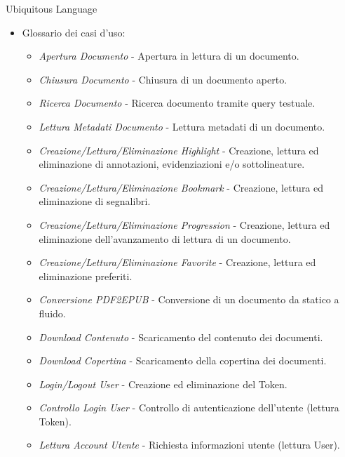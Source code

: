     \begin{frame}{Ubiquitous Language}
        \begin{itemize}
            \item Glossario dei casi d'uso:
                \begin{itemize}
                    \item \textit{Apertura Documento} - Apertura in lettura di un documento.
                    \item \textit{Chiusura Documento} - Chiusura di un documento aperto.
                    \item \textit{Ricerca Documento} - Ricerca documento tramite query testuale.
                    \item \textit{Lettura Metadati Documento} - Lettura metadati di un documento.
                    \item \textit{Creazione/Lettura/Eliminazione Highlight} - Creazione, lettura ed eliminazione di annotazioni, evidenziazioni e/o sottolineature.
                    \item \textit{Creazione/Lettura/Eliminazione Bookmark} - Creazione, lettura ed eliminazione di segnalibri.
                    \item \textit{Creazione/Lettura/Eliminazione Progression} - Creazione, lettura ed eliminazione dell'avanzamento di lettura di un documento.
                    \item \textit{Creazione/Lettura/Eliminazione Favorite} - Creazione, lettura ed eliminazione preferiti.
                    \item \textit{Conversione PDF2EPUB} - Conversione di un documento da statico a fluido.
                    \item \textit{Download Contenuto} - Scaricamento del contenuto dei documenti.
                    \item \textit{Download Copertina} - Scaricamento della copertina dei documenti.
                    \item \textit{Login/Logout User} - Creazione ed eliminazione del Token.
                    \item \textit{Controllo Login User} - Controllo di autenticazione dell'utente (lettura Token).
                    \item \textit{Lettura Account Utente} - Richiesta informazioni utente (lettura User).
                \end{itemize}
        \end{itemize}
    \end{frame}

